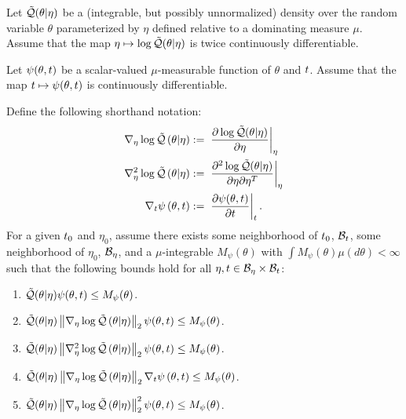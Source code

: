 \begin{assu}
%
Let $\tilde{\mathcal{Q}}(\theta \vert \eta)$ be a (integrable, but possibly unnormalized)
density over the random variable $\theta$ parameterized by $\eta$ defined
relative to a dominating measure $\mu$.  Assume that the map $\eta \mapsto
\log \tilde{\mathcal{Q}}(\theta \vert \eta)$ is twice continuously differentiable.

Let $\psi(\theta, t)$ be a scalar-valued $\mu$-measurable function of
$\theta$ and $t$.  Assume that the map $t \mapsto \psi(\theta, t)$ is
continuously differentiable.

Define the following shorthand notation:
%
\begin{align*}
%
\lqgrad{\theta \vert \eta} :={}&
    \fracat{\partial \log \qtil(\theta \vert \eta)}{\partial \eta}{\eta} \\
%
\lqhess{\theta \vert \eta} :={}&
    \fracat{\partial^2 \log \qtil(\theta \vert \eta)}
           {\partial \eta \partial \eta^T}{\eta} \\
%
\psigrad{\theta, \t} :={}& \fracat{\partial \psi(\theta, \t)}{\partial \t}{\t}.
%
\end{align*}
%
For a given $t_0$ and $\eta_0$, assume there exists some neighborhood of
$t_0$, $\mathcal{B}_t$, some neighborhood of $\eta_0$, $\mathcal{B}_\eta$, and a
$\mu$-integrable $M_\psi(\theta)$ with $\int M_\psi(\theta) \mu(d\theta) <
\infty$ such that the following bounds hold for all $\eta, t \in \mathcal{B}_\eta
\times \mathcal{B}_t$:
%
\begin{enumerate}
%
\item {}
$\tilde{\mathcal{Q}}(\theta \vert \eta) \psi(\theta, t) \le M_\psi(\theta)$.
%
\item {}
$\tilde{\mathcal{Q}}(\theta \vert \eta) \left\Vert{\nabla_\eta \log \tilde{\mathcal{Q}}}\left(\theta \vert \eta\right)\right\Vert_2 \psi(\theta, t) \le
M_\psi(\theta)$.
%
\item {}
$\tilde{\mathcal{Q}}(\theta \vert \eta) \left\Vert{\nabla_\eta^2 \log \tilde{\mathcal{Q}}}\left(\theta \vert \eta\right)\right\Vert_2 \psi(\theta, t) \le
M_\psi(\theta)$.
%
\item {}
$\tilde{\mathcal{Q}}(\theta \vert \eta) \left\Vert{\nabla_\eta \log \tilde{\mathcal{Q}}}\left(\theta \vert \eta\right)\right\Vert_2 {\nabla_t \psi}\left(\theta, t\right)
\le M_\psi(\theta)$.
%
\item {}
$\tilde{\mathcal{Q}}(\theta \vert \eta) \left\Vert{\nabla_\eta \log \tilde{\mathcal{Q}}}\left(\theta \vert \eta\right)\right\Vert^2_2 \psi(\theta, t) \le
M_\psi(\theta)$.
%
\end{enumerate}
%
\end{assu}


